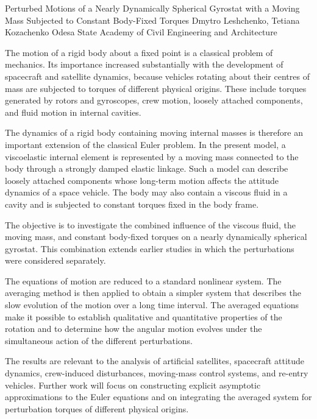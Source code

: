 \ReportHeading
  {Perturbed Motions of a Nearly Dynamically Spherical Gyrostat with a Moving Mass Subjected to Constant Body-Fixed Torques}
  {Dmytro Leshchenko, Tetiana Kozachenko}
  {Odesa State Academy of Civil Engineering and Architecture}
  {}

The motion of a rigid body about a fixed point is a classical problem of mechanics. Its importance increased substantially with the development of spacecraft and satellite dynamics, because vehicles rotating about their centres of mass are subjected to torques of different physical origins. These include torques generated by rotors and gyroscopes, crew motion, loosely attached components, and fluid motion in internal cavities.

The dynamics of a rigid body containing moving internal masses is therefore an important extension of the classical Euler problem. In the present model, a viscoelastic internal element is represented by a moving mass connected to the body through a strongly damped elastic linkage. Such a model can describe loosely attached components whose long-term motion affects the attitude dynamics of a space vehicle. The body may also contain a viscous fluid in a cavity and is subjected to constant torques fixed in the body frame.

The objective is to investigate the combined influence of the viscous fluid, the moving mass, and constant body-fixed torques on a nearly dynamically spherical gyrostat. This combination extends earlier studies in which the perturbations were considered separately.

The equations of motion are reduced to a standard nonlinear system. The averaging method is then applied to obtain a simpler system that describes the slow evolution of the motion over a long time interval. The averaged equations make it possible to establish qualitative and quantitative properties of the rotation and to determine how the angular motion evolves under the simultaneous action of the different perturbations.

The results are relevant to the analysis of artificial satellites, spacecraft attitude dynamics, crew-induced disturbances, moving-mass control systems, and re-entry vehicles. Further work will focus on constructing explicit asymptotic approximations to the Euler equations and on integrating the averaged system for perturbation torques of different physical origins.
